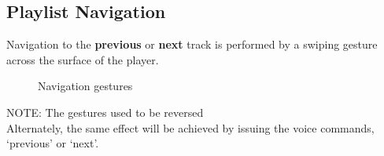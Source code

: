 \documentclass[12pt,letterpaper]{article}
\begin{document}
\subsection*{Playlist Navigation}
Navigation to the \textbf{previous} or \textbf{next} track is performed by a swiping gesture across the surface of the player.
	\begin{figure}[H]
		\centering
		\hspace{1in}
		\caption{Navigation gestures}
	\end{figure}
{\color{green}NOTE: The gestures used to be reversed} \\
Alternately, the same effect will be achieved by issuing the voice commands, `previous' or `next'. \\
\end{document}
